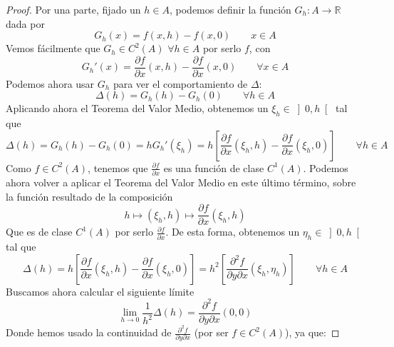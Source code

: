 \begin{teo}[de Clairaut]
\begin{proof}
        Por una parte, fijado un $h\in A$, podemos definir la función $G_h:A\rightarrow\mathbb{R}$ dada por
        \begin{equation*}
            G_h(x) = f(x,h) - f(x,0) \qquad x\in A
        \end{equation*}
        Vemos fácilmente que $G_h\in C^2(A)$ $\forall h\in A$ por serlo $f$, con
        \begin{equation*}
            G_h'(x) = \dfrac{\partial f}{\partial x}(x,h) - \dfrac{\partial f}{\partial x}(x,0) \qquad \forall x\in A
        \end{equation*}
        Podemos ahora usar $G_h$ para ver el comportamiento de $\Delta$:
        \begin{equation*}
            \Delta(h) = G_h(h) - G_h(0) \qquad \forall h\in A
        \end{equation*}
        Aplicando ahora el Teorema del Valor Medio, obtenemos un $\xi_h \in \left]0, h\right[$ tal que
        \begin{equation*}
            \Delta(h) = G_h(h) - G_h(0) = hG_h'(\xi_h) = h \left[\dfrac{\partial f}{\partial x}(\xi_h,h) - \dfrac{\partial f}{\partial x}(\xi_h,0)\right] \qquad \forall h\in A
        \end{equation*}
        Como $f\in C^2(A)$, tenemos que $\frac{\partial f}{\partial x}$ es una función de clase $C^1(A)$. Podemos ahora volver a aplicar el Teorema del Valor Medio en este último término, sobre la función resultado de la composición
        \begin{equation*}
            h \longmapsto (\xi_h, h) \longmapsto \dfrac{\partial f}{\partial x}(\xi_h, h)
        \end{equation*}
        Que es de clase $C^1(A)$ por serlo $\frac{\partial f}{\partial x}$. De esta forma, obtenemos un $\eta_h \in \left]0,h\right[$ tal que
        \begin{equation*}
            \Delta(h) = h \left[\dfrac{\partial f}{\partial x}(\xi_h,h) - \dfrac{\partial f}{\partial x}(\xi_h,0)\right] = h^2 \left[\dfrac{\partial^2 f}{\partial y\partial x}(\xi_h, \eta_h)\right] \qquad \forall h \in A
        \end{equation*}
        Buscamos ahora calcular el siguiente límite
        \begin{equation*}
            \lim_{h\to0}\dfrac{1}{h^2}\Delta(h) = \dfrac{\partial^2 f}{\partial y\partial x}(0,0)
        \end{equation*}
        Donde hemos usado la continuidad de $\frac{\partial^2 f}{\partial y\partial x}$ (por ser $f\in C^2(A)$), ya que:

\end{proof}
\end{teo}
